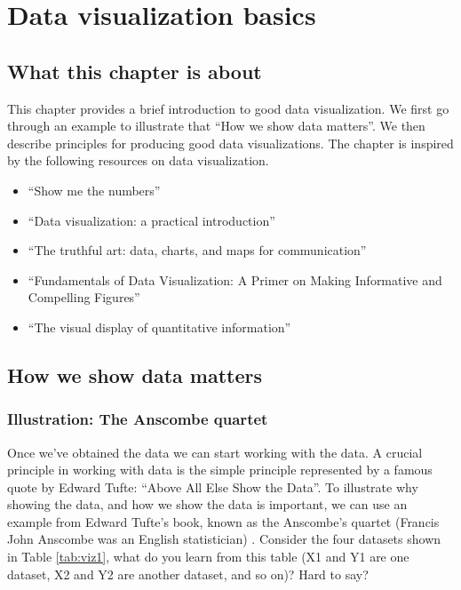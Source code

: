 \documentclass[
]{book}
\providecommand{\tightlist}{%
  \setlength{\itemsep}{0pt}\setlength{\parskip}{0pt}}
\begin{document}
\hypertarget{data-visualization-basics}{%
\chapter{Data visualization basics}\label{data-visualization-basics}}

\hypertarget{what-this-chapter-is-about-9}{%
\section{What this chapter is about}\label{what-this-chapter-is-about-9}}

This chapter provides a brief introduction to good data visualization. We first go through an example to illustrate that ``How we show data matters''. We then describe principles for producing good data visualizations. The chapter is inspired by the following resources on data visualization.

\begin{itemize}
\tightlist
\item
  ``Show me the numbers'' \citep{few2012show}
\item
  ``Data visualization: a practical introduction'' \citep{healy2018data}
\item
  ``The truthful art: data, charts, and maps for communication'' \citep{cairo}
\item
  ``Fundamentals of Data Visualization: A Primer on Making Informative and Compelling Figures'' \citep{wilke2019fundamentals}
\item
  ``The visual display of quantitative information'' \citep{tufte2001visual}
\end{itemize}

\hypertarget{how-we-show-data-matters}{%
\section{How we show data matters}\label{how-we-show-data-matters}}

\hypertarget{illustration-the-anscombe-quartet}{%
\subsection*{Illustration: The Anscombe quartet}\label{illustration-the-anscombe-quartet}}

Once we've obtained the data we can start working with the data. A crucial principle in working with data is the simple principle represented by a famous quote by Edward Tufte: ``Above All Else Show the Data''. To illustrate why showing the data, and how we show the data is important, we can use an example from Edward Tufte's book, known as the Anscombe's quartet (Francis John Anscombe was an English statistician) \citep{tufte2001visual}. Consider the four datasets shown in Table \ref{tab:viz1}, what do you learn from this table (X1 and Y1 are one dataset, X2 and Y2 are another dataset, and so on)? Hard to say?
\end{document}
